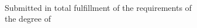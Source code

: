 \begin{titlepage}
    \begin{addmargin}[-1cm]{-3cm}
    \begin{center}
        \large

        \hfill

        \vfill

        \begingroup
            \Large
            {\color{CTtitle}
                \myTitle
            } \\ \bigskip
        \endgroup


        \vfill

        Submitted in total fulfillment of the requirements of\\
        the degree of \myDegree \\ \bigskip \bigskip \bigskip \bigskip

        \myTime \bigskip

        \myDepartment \\ \medskip
        \myFaculty \\ \medskip
        \myUni \\ %

        \vfill

    \end{center}
  \end{addmargin}
\end{titlepage}
